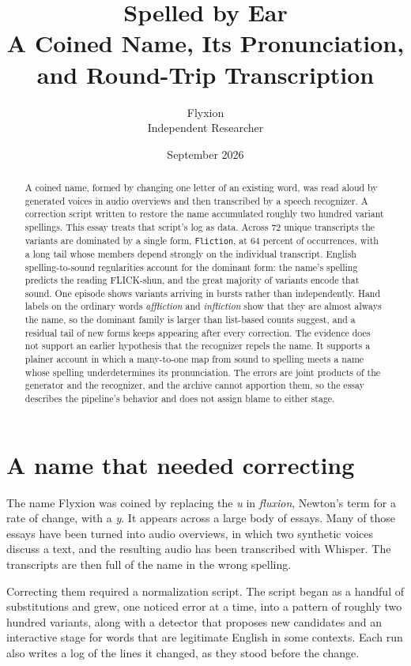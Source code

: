 \documentclass[11pt]{article}
\title{Spelled by Ear\\[0.4em]\large A Coined Name, Its Pronunciation, and Round-Trip Transcription}
\author{Flyxion\\Independent Researcher}
\date{September 2026}
\begin{document}
\maketitle

\begin{abstract}
A coined name, formed by changing one letter of an existing word, was read aloud by generated voices in audio overviews and then transcribed by a speech recognizer. A correction script written to restore the name accumulated roughly two hundred variant spellings. This essay treats that script's log as data. Across 72 unique transcripts the variants are dominated by a single form, \texttt{Fliction}, at 64 percent of occurrences, with a long tail whose members depend strongly on the individual transcript. English spelling-to-sound regularities account for the dominant form: the name's spelling predicts the reading FLICK-shun, and the great majority of variants encode that sound. One episode shows variants arriving in bursts rather than independently. Hand labels on the ordinary words \emph{affliction} and \emph{infliction} show that they are almost always the name, so the dominant family is larger than list-based counts suggest, and a residual tail of new forms keeps appearing after every correction. The evidence does not support an earlier hypothesis that the recognizer repels the name. It supports a plainer account in which a many-to-one map from sound to spelling meets a name whose spelling underdetermines its pronunciation. The errors are joint products of the generator and the recognizer, and the archive cannot apportion them, so the essay describes the pipeline's behavior and does not assign blame to either stage.
\end{abstract}

\section{A name that needed correcting}

The name Flyxion was coined by replacing the \emph{u} in \emph{fluxion}, Newton's term for a rate of change, with a \emph{y}. It appears across a large body of essays. Many of those essays have been turned into audio overviews, in which two synthetic voices discuss a text, and the resulting audio has been transcribed with Whisper. The transcripts are then full of the name in the wrong spelling.

Correcting them required a normalization script. The script began as a handful of substitutions and grew, one noticed error at a time, into a pattern of roughly two hundred variants, along with a detector that proposes new candidates and an interactive stage for words that are legitimate English in some contexts. Each run also writes a log of the lines it changed, as they stood before the change.
\end{document}
